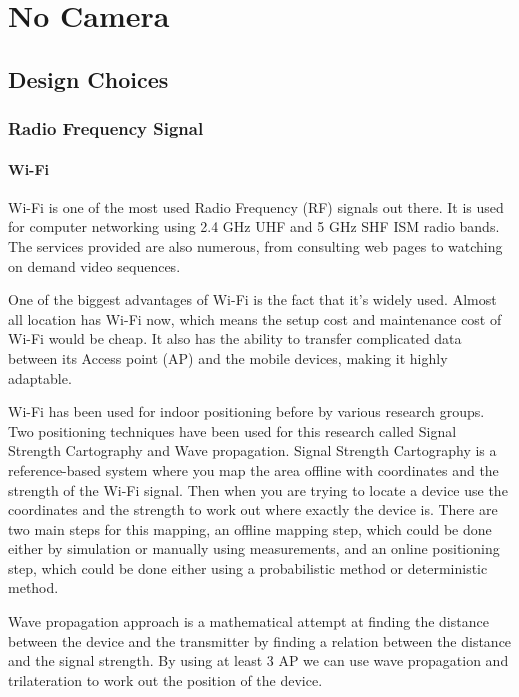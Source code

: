 \chapter{No Camera}

\label{ch:no_camera}

\section{Design Choices}
\subsection{Radio Frequency Signal}


\subsubsection{Wi-Fi}

Wi-Fi is one of the most used Radio Frequency (RF) signals out there.
It is used for computer networking using 2.4 GHz UHF and 5 GHz SHF
ISM radio bands\cite{wifi-wikipedia}. The services provided are also
numerous, from consulting web pages to watching on demand video sequences. 

One of the biggest advantages of Wi-Fi is the fact that it\textquoteright s
widely used. Almost all location has Wi-Fi now, which means the setup
cost and maintenance cost of Wi-Fi would be cheap. It also has the
ability to transfer complicated data between its Access point (AP)
and the mobile devices, making it highly adaptable. 

Wi-Fi has been used for indoor positioning before by various research
groups. Two positioning techniques have been used for this research
called Signal Strength Cartography and Wave propagation. Signal Strength
Cartography is a reference-based system where you map the area offline
with coordinates and the strength of the Wi-Fi signal. Then when you
are trying to locate a device use the coordinates and the strength
to work out where exactly the device is. There are two main steps
for this mapping, an offline mapping step, which could be done either
by simulation or manually using measurements, and an online positioning
step, which could be done either using a probabilistic method or deterministic
method. 

Wave propagation approach is a mathematical attempt at finding the
distance between the device and the transmitter by finding a relation
between the distance and the signal strength. By using at least 3
AP we can use wave propagation and trilateration to work out the position
of the device. 

